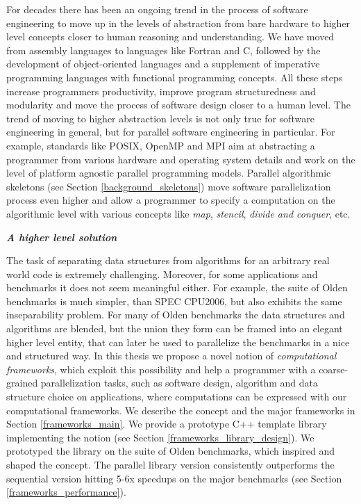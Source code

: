\begin{description}[style=unboxed,leftmargin=0cm]
\item[\textit{The ongoing trend to higher abstraction levels}] For decades there has been an ongoing trend in the process of software engineering to move up in the levels of abstraction from bare hardware to higher level concepts closer to human reasoning and understanding. We have moved from assembly languages to languages like Fortran and C, followed by the development of object-oriented languages and a supplement of imperative programming languages with functional programming concepts. All these steps increase programmers productivity, improve program structuredness and modularity and move the process of software design closer to a human level. The trend of moving to higher abstraction levels is not only true for software engineering in general, but for parallel software engineering in particular. For example, standards like POSIX, OpenMP and MPI aim at abstracting a programmer from various hardware and operating system details and work on the level of platform agnostic parallel programming models. Parallel algorithmic skeletons \cite{mccool-patterns} (see Section \ref{background_skeletons}) move software parallelization process even higher and allow a programmer to specify a computation on the algorithmic level with various concepts like \textit{map}, \textit{stencil}, \textit{divide and conquer}, etc.
\end{description}
\begin{center}
\textbf{\large \textit{A higher level solution}}
\end{center}
\quad The task of separating data structures from algorithms for an arbitrary real world code is extremely challenging. Moreover, for some applications and benchmarks it does not seem meaningful either. For example, the suite of Olden benchmarks is much simpler, than SPEC CPU2006, but also exhibits the same inseparability problem. For many of Olden benchmarks the data structures and algorithms are blended, but the union they form can be framed into an elegant higher level entity, that can later be used to parallelize the benchmarks in a nice and structured way.\newline\null
\quad In this thesis we propose a novel notion of \textit{computational frameworks}, which exploit this possibility and help a programmer with a coarse-grained parallelization tasks, such as software design, algorithm and data structure choice on applications, where computations can be expressed with our computational frameworks. We describe the concept and the major frameworks in Section \ref{frameworks_main}. We provide a prototype C++ template library implementing the notion \cite{frameworks-repo} (see Section \ref{frameworks_library_design}). We prototyped the library on the suite of Olden benchmarks, which inspired and shaped the concept. The parallel library version consistently outperforms the sequential version hitting 5-6x speedups on the major benchmarks (see Section \ref{frameworks_performance}).
